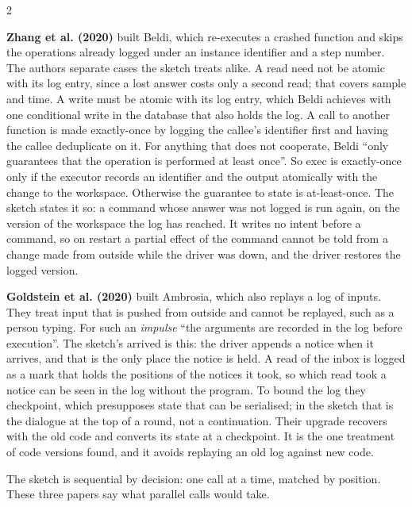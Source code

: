 \documentclass{article}
\newcommand{\topic}[1]{\par\medskip{\bfseries\normalsize #1}\par\smallskip}
\newcommand{\paper}[1]{\par\smallskip\textbf{#1}\quad}
\newcommand{\cd}[1]{{\ttfamily #1}}
\begin{document}
\begin{multicols}{2}
\paper{Zhang et al. (2020)} built Beldi, which re-executes a crashed function and skips the operations already
logged under an instance identifier and a step number. The authors separate cases the sketch treats
alike. A read need not be atomic with its log entry, since a lost answer costs only a second
read; that covers \cd{sample} and \cd{time}. A write must be atomic with its log entry, which
Beldi achieves with one conditional write in the database that also holds the log. A call to
another function is made exactly-once by logging the callee's identifier first and having the
callee deduplicate on it. For anything that does not cooperate, Beldi ``only guarantees that the
operation is performed at least once''. So \cd{exec} is exactly-once only if the executor records
an identifier and the output atomically with the change to the workspace. Otherwise the guarantee
to state is at-least-once. The sketch states it so: a command whose answer was not logged is run
again, on the version of the workspace the log has reached. It writes no intent before a
command, so on restart a partial effect of the command cannot be told from a change made from
outside while the driver was down, and the driver restores the logged version.

\paper{Goldstein et al. (2020)} built Ambrosia, which also replays a log of inputs. They treat input that is
pushed from outside and cannot be replayed, such as a person typing. For such an \emph{impulse}
``the arguments are recorded in the log before execution''. The sketch's \cd{arrived}
is this: the driver appends a notice when it arrives, and that is the only place the notice is
held. A read of the \cd{inbox} is logged as a mark that holds the positions of the notices it
took, so which read took a notice can be seen in the log without the program. To bound the log they checkpoint, which presupposes state that can be
serialised; in the sketch that is the dialogue at the top of a round, not a continuation. Their
upgrade recovers with the old code and converts its state at a checkpoint. It is the one
treatment of code versions found, and it avoids replaying an old log against new code.

\topic{Concurrency}

The sketch is sequential by decision: one call at a time, matched by position. These three
papers say what parallel calls would take.


\end{multicols}
\end{document}
